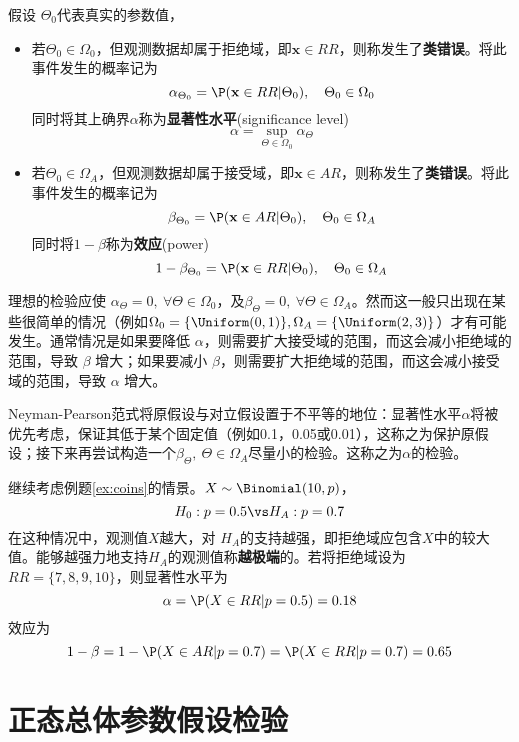 \begin{definition}
    假设 $\Theta_0$代表真实的参数值，
    \begin{itemize}
        \item 若$\Theta_0 \in \Omega_0$，但观测数据却属于拒绝域，即$\mathbf{x} \in RR$，则称发生了\textbf{\uppercase\expandafter{}类错误}。将此事件发生的概率记为
              \[ \alpha_{\Theta_0} = \P(\mathbf{x} \in RR|\Theta_0),\quad \Theta_0 \in \Omega_0 \]
              同时将其上确界$\alpha$称为\textbf{显著性水平}(significance level)
              \[ \alpha = \sup_{\Theta \in \Omega_0} \alpha_{\Theta} \]
        \item 若$\Theta_0 \in \Omega_A$，但观测数据却属于接受域，即$\mathbf{x} \in AR$，则称发生了\textbf{\uppercase\expandafter{}类错误}。将此事件发生的概率记为
              \[ \beta_{\Theta_0} = \P(\mathbf{x} \in AR|\Theta_0) ,\quad \Theta_0 \in \Omega_A\]
              同时将$1-\beta$称为\textbf{效应}(power)
              \[ 1-\beta_{\Theta_0} = \P(\mathbf{x} \in RR|\Theta_0) ,\quad \Theta_0 \in \Omega_A \]
    \end{itemize}
\end{definition}

理想的检验应使 $\alpha_\Theta = 0 ,\ \forall \Theta \in \Omega_0$，及$\beta_\Theta = 0 ,\ \forall \Theta \in \Omega_A$。然而这一般只出现在某些很简单的情况（例如$\Omega_0=\{ \Uniform(0,1) \},\Omega_A=\{ \Uniform(2,3) \}$）才有可能发生。通常情况是如果要降低 $\alpha$，则需要扩大接受域的范围，而这会减小拒绝域的范围，导致 $\beta$ 增大；如果要减小 $\beta$，则需要扩大拒绝域的范围，而这会减小接受域的范围，导致 $\alpha$ 增大。

Neyman-Pearson范式将原假设与对立假设置于不平等的地位：显著性水平$\alpha$将被优先考虑，保证其低于某个固定值（例如0.1，0.05或0.01），这称之为保护原假设；接下来再尝试构造一个$\beta_{\Theta} ,\ \Theta \in \Omega_A$尽量小的检验。这称之为$\alpha$的检验。

继续考虑例题\ref{ex:coins}的情景。$X \sim \Binomial(10, p)$，
\[ H_0: p=0.5 \vs H_A : p = 0.7 \]
在这种情况中，观测值$X$越大，对 $H_A$的支持越强，即拒绝域应包含$X$中的较大值。能够越强力地支持$H_A$的观测值称\textbf{越极端}的。若将拒绝域设为 $RR=\{ 7,8,9,10 \}$，则显著性水平为
\[ \alpha = \P(X \in RR|p=0.5) = 0.18 \]
效应为
\[ 1-\beta=1-\P(X \in AR|p=0.7) = \P(X \in RR|p=0.7)=0.65\]



\section{正态总体参数假设检验}

